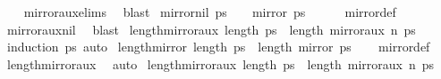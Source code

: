 \begin{isabellebody}
%
\isadelimproof
\ \ %
\endisadelimproof
%
\isatagproof
{}\isamarkupfalse%
\ mirror{}{\isacharunderscore}{\kern0pt}aux{\isachardot}{\kern0pt}elims\ \isamarkupfalse%
\ blast%
\endisatagproof
{\isafoldproof}%
%
\isadelimproof
\isanewline
%
\endisadelimproof
\isanewline
{}\isamarkupfalse%
\ mirror{}{\isacharunderscore}{\kern0pt}nil{\isacharcolon}{\kern0pt}\ {\isachardoublequoteopen}ps\ {\isacharequal}{\kern0pt}\ {\isacharbrackleft}{\kern0pt}{\isacharbrackright}{\kern0pt}\ {\isasymlongleftrightarrow}\ mirror{}\ ps\ {\isacharequal}{\kern0pt}\ {\isacharbrackleft}{\kern0pt}{\isacharbrackright}{\kern0pt}{\isachardoublequoteclose}\isanewline
%
\isadelimproof
\ \ %
\endisadelimproof
%
\isatagproof
{}\isamarkupfalse%
\ mirror{}{\isacharunderscore}{\kern0pt}def\ \isamarkupfalse%
\ mirror{}{\isacharunderscore}{\kern0pt}aux{\isacharunderscore}{\kern0pt}nil\ \isamarkupfalse%
\ blast%
\endisatagproof
{\isafoldproof}%
%
\isadelimproof
\isanewline
%
\endisadelimproof
\isanewline
{}\isamarkupfalse%
\ length{\isacharunderscore}{\kern0pt}mirror{}{\isacharunderscore}{\kern0pt}aux{\isacharcolon}{\kern0pt}\ {\isachardoublequoteopen}length\ ps\ {\isacharequal}{\kern0pt}\ length\ {\isacharparenleft}{\kern0pt}mirror{}{\isacharunderscore}{\kern0pt}aux\ n\ ps{\isacharparenright}{\kern0pt}{\isachardoublequoteclose}\isanewline
%
\isadelimproof
\ \ %
\endisadelimproof
%
\isatagproof
{}\isamarkupfalse%
\ {\isacharparenleft}{\kern0pt}induction\ ps{\isacharparenright}{\kern0pt}\ auto%
\endisatagproof
{\isafoldproof}%
%
\isadelimproof
\isanewline
%
\endisadelimproof
\isanewline
{}\isamarkupfalse%
\ length{\isacharunderscore}{\kern0pt}mirror{}{\isacharcolon}{\kern0pt}\ {\isachardoublequoteopen}length\ ps\ {\isacharequal}{\kern0pt}\ length\ {\isacharparenleft}{\kern0pt}mirror{}\ ps{\isacharparenright}{\kern0pt}{\isachardoublequoteclose}\isanewline
%
\isadelimproof
\ \ %
\endisadelimproof
%
\isatagproof
{}\isamarkupfalse%
\ mirror{}{\isacharunderscore}{\kern0pt}def\ \isamarkupfalse%
\ length{\isacharunderscore}{\kern0pt}mirror{}{\isacharunderscore}{\kern0pt}aux\ \isamarkupfalse%
\ auto%
\endisatagproof
{\isafoldproof}%
%
\isadelimproof
\isanewline
%
\endisadelimproof
\isanewline
{}\isamarkupfalse%
\ length{\isacharunderscore}{\kern0pt}mirror{}{\isacharunderscore}{\kern0pt}aux{\isacharcolon}{\kern0pt}\ {\isachardoublequoteopen}length\ ps\ {\isacharequal}{\kern0pt}\ length\ {\isacharparenleft}{\kern0pt}mirror{}{\isacharunderscore}{\kern0pt}aux\ n\ ps{\isacharparenright}{\kern0pt}{\isachardoublequoteclose}\isanewline

\end{isabellebody}
